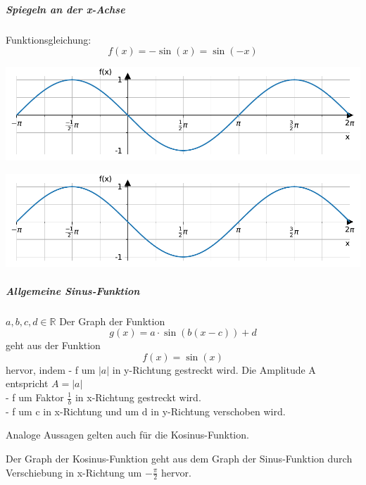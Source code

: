 \documentclass[
  11pt,
  a4paper,
  DIV=11,
  numbers=noendperiod]{scrartcl}
\let\oldsubparagraph\subparagraph
\renewcommand{\subparagraph}[1]{\oldsubparagraph{#1}\mbox{}}
\begin{document}
\subparagraph{Spiegeln an der x-Achse}\label{spiegeln-an-der-x-achse}

Funktionsgleichung: \[
f(x)=-\sin(x) = \sin(-x)
\]

\includegraphics{7_Trigonometrische_Funktionen_files/figure-pdf/cell-16-output-1.pdf}

\includegraphics{7_Trigonometrische_Funktionen_files/figure-pdf/cell-17-output-1.pdf}

\subparagraph{Allgemeine
Sinus-Funktion}\label{allgemeine-sinus-funktion}

\begin{tcolorbox}[enhanced jigsaw, colbacktitle=quarto-callout-note-color!10!white, breakable, bottomtitle=1mm, toptitle=1mm, opacitybacktitle=0.6, opacityback=0, rightrule=.15mm, titlerule=0mm, leftrule=.75mm, colframe=quarto-callout-note-color-frame, toprule=.15mm, left=2mm, colback=white, title=\textcolor{quarto-callout-note-color}{\faInfo}\hspace{0.5em}{Definition}, coltitle=black, arc=.35mm, bottomrule=.15mm]

\(a, b, c, d \in \mathbb{R}\) Der Graph der Funktion\\
\[
g(x)=a\cdot \sin(b(x-c))+d
\] geht aus der Funktion \[
f(x) = \sin(x)
\] hervor, indem - f um \(|a|\) in y-Richtung gestreckt wird. Die
Amplitude A entspricht \(A = |a|\)\\
- f um Faktor \(\frac{1}{b}\) in x-Richtung gestreckt wird.\\
- f um c in x-Richtung und um d in y-Richtung verschoben wird.

\end{tcolorbox}

\begin{tcolorbox}[enhanced jigsaw, colbacktitle=quarto-callout-tip-color!10!white, breakable, bottomtitle=1mm, toptitle=1mm, opacitybacktitle=0.6, opacityback=0, rightrule=.15mm, titlerule=0mm, leftrule=.75mm, colframe=quarto-callout-tip-color-frame, toprule=.15mm, left=2mm, colback=white, title=\textcolor{quarto-callout-tip-color}{\faLightbulb}\hspace{0.5em}{Bemerkung}, coltitle=black, arc=.35mm, bottomrule=.15mm]

Analoge Aussagen gelten auch für die Kosinus-Funktion.

Der Graph der Kosinus-Funktion geht aus dem Graph der Sinus-Funktion
durch Verschiebung in x-Richtung um \(-\frac{\pi}{2}\) hervor.

\end{tcolorbox}
\end{document}
